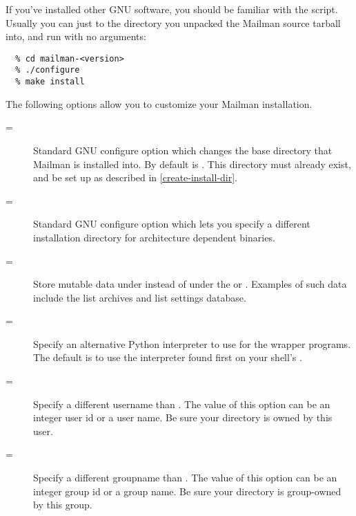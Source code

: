 \documentclass{howto}
\begin{document}
If you've installed other GNU software, you should be familiar with the
 script.  Usually you can just  to the
directory you unpacked the Mailman source tarball into, and run
 with no arguments:

\begin{verbatim}
  % cd mailman-<version>
  % ./configure
  % make install
\end{verbatim}

The following options allow you to customize your Mailman
installation.

\begin{description}
\item[=]
    Standard GNU configure option which changes the base directory that
    Mailman is installed into.  By default  is
    .  This directory must already exist, and be set
    up as described in \ref{create-install-dir}.

\item[=]
    Standard GNU configure option which lets you specify a different
    installation directory for architecture dependent binaries.

\item[=]
    Store mutable data under  instead of under the  or
    .  Examples of such data include the list archives and
    list settings database.

\item[=]
    Specify an alternative Python interpreter to use for the wrapper programs.
    The default is to use the interpreter found first on your shell's
    .

\item[=]
    Specify a different username than .  The value of this
    option can be an integer user id or a user name.  Be sure your
     directory is owned by this user.

\item[=]
    Specify a different groupname than .  The value of this
    option can be an integer group id or a group name.  Be sure your
     directory is group-owned by this group.


\end{description}
\end{document}
